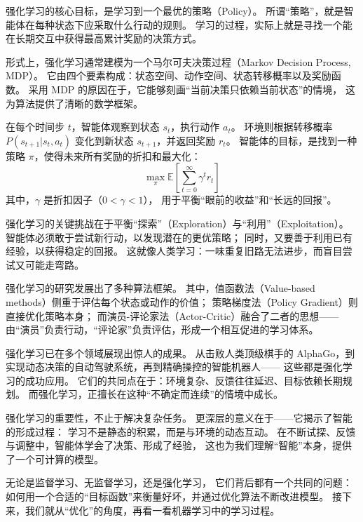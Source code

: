 强化学习的核心目标，是学习到一个最优的策略（Policy）。  
所谓“策略”，就是智能体在每种状态下应采取什么行动的规则。  
学习的过程，实际上就是寻找一个能在长期交互中获得最高累计奖励的决策方式。



形式上，强化学习通常建模为一个马尔可夫决策过程（Markov Decision Process, MDP）。  
它由四个要素构成：状态空间、动作空间、状态转移概率以及奖励函数。  
采用 MDP 的原因在于，它能够刻画“当前决策只依赖当前状态”的情境，  
这为算法提供了清晰的数学框架。



在每个时间步 $t$，智能体观察到状态 $s_t$，执行动作 $a_t$。  
环境则根据转移概率 $P(s_{t+1}|s_t, a_t)$ 变化到新状态 $s_{t+1}$，并返回奖励 $r_t$。  
智能体的目标，是找到一种策略 $\pi$，使得未来所有奖励的折扣和最大化：
$$
\max_\pi \mathbb{E}\left[\sum_{t=0}^\infty \gamma^t r_t\right]
$$  
其中，$\gamma$ 是折扣因子（$0 < \gamma < 1$），  
用于平衡“眼前的收益”和“长远的回报”。



强化学习的关键挑战在于平衡“探索”（Exploration）与“利用”（Exploitation）。  
智能体必须敢于尝试新行动，以发现潜在的更优策略；  
同时，又要善于利用已有经验，以获得稳定的回报。  
这就像人类学习：一味重复旧路无法进步，而盲目尝试又可能走弯路。



强化学习的研究发展出了多种算法框架。  
其中，值函数法（Value-based methods）侧重于评估每个状态或动作的价值；  
策略梯度法（Policy Gradient）则直接优化策略本身；  
而演员-评论家法（Actor-Critic）融合了二者的思想——  
由“演员”负责行动，“评论家”负责评估，形成一个相互促进的学习体系。



强化学习已在多个领域展现出惊人的成果。  
从击败人类顶级棋手的 AlphaGo，到实现动态决策的自动驾驶系统，再到精确操控的智能机器人——  
这些都是强化学习的成功应用。  
它们的共同点在于：环境复杂、反馈往往延迟、目标依赖长期规划。  
而强化学习，正擅长在这种“不确定而连续”的情境中成长。



强化学习的重要性，不止于解决复杂任务。  
更深层的意义在于——它揭示了智能的形成过程：  
学习不是静态的积累，而是与环境的动态互动。  
在不断试探、反馈与调整中，智能体学会了决策、形成了经验，  
这也为我们理解“智能”本身，提供了一个可计算的模型。



无论是监督学习、无监督学习，还是强化学习，  
它们背后都有一个共同的问题：  
如何用一个合适的“目标函数”来衡量好坏，并通过优化算法不断改进模型。  
接下来，我们就从“优化”的角度，再看一看机器学习中的学习过程。

